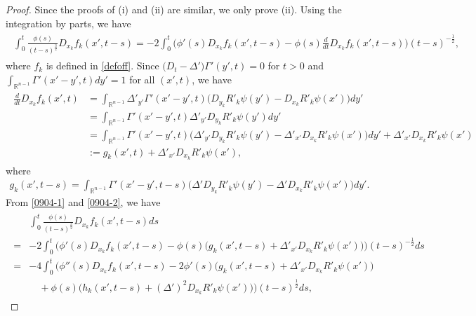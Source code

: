 \documentclass{amsart}
\numberwithin{equation}{section}
\newcommand{\Rn}{{\mathbb R}^{n-1}}
\newcommand{\De}{\Delta}
\newcommand{\Ga}{\Gamma}
\begin{document}
 \begin{proof}
Since the proofs of (i) and (ii) are similar, we only prove (ii). Using the integration by parts, we have 
\begin{align}\label{0904-1}
\begin{split}
\int_0^t   \frac{\phi(s)}{(t-s)^\frac32}     D_{x_k}  f_k (x', t-s) 
=  -  2\int_0^t    \Big(  \phi' (s)      D_{x_k}  f _k (x', t-s)  -  \phi (s)      \frac{d}{dt} D_{x_k}  f _k (x', t-s)  \Big)  (t-s)^{-\frac12} ,
\end{split}
\end{align}
where $f_k$ is defined in \eqref{defoff}. 
Since $ \big( D_t -\De' \big) \Ga'(y', t) =0$ for $ t> 0$ and   $\int_{\Rn} \Ga' (x' - y', t) dy' =1$ for all  $(x', t)$, we have
\begin{align}\label{0904-2}
\begin{split}
\frac{d}{dt}  D_{x_k}  f _k ( x', t)  &  =\int_{\Rn} \De'_{y'} \Ga' (x'-y', t) \Big( D_{y_k} R'_k \psi(y')  - D_{x_k} R'_k \psi(x') \Big) dy'\\  
&  =\int_{\Rn}  \Ga' (x'-y', t)  \De'_{y '} D_{y_k} R'_k \psi(y')  dy'\\ 
&  =\int_{\Rn}   \Ga' (x'-y', t) \Big(  \De'_{y'} D_{y_k}   R'_k\psi(y')  -  \De'_{x'} D_{x_k} R'_k \psi(x') \Big) dy' + \De'_{x'} D_{x_k} R'_k \psi(x')\\
& := g_k(x', t) +   \De'_{x'} D_{x_k} R'_k \psi(x'),
\end{split}
\end{align}
where 
\begin{align*}
g_k (x', t-s)  = \int_{\Rn} \Ga' (x'- y', t-s) \Big(  \De'  D_{y_k} R'_k \psi(y') -   \De' D_{x_k}  R'_k \psi(x') \Big) dy'.
\end{align*} 
From \eqref{0904-1} and \eqref{0904-2},  we have 
\begin{align*}%
\begin{split}
&\int_0^t   \frac{\phi(s)}{(t-s)^\frac32}  D_{x_k}  f _k (x', t-s) ds\\
 =& -  2\int_0^t    \Big(  \phi' (s)    D_{x_k}  f _k (x', t-s)  -  \phi (s)   \big(g_k (x', t-s) +   \De'_{x'} D_{x_k} R'_k \psi(x')    \big)  \Big)  (t-s)^{-\frac12}   ds\\
=& - 4\int_0^t    \Big(  \phi'' (s)    D_{x_k}  f _k(x', t-s)  -  2\phi'  (s)   \Big(g_k (x', t-s) +   \De'_{x'} D_{x_k} R'_k \psi(x') \Big) \\
& \quad    + \phi (s) \big(h_k (x', t-s)   + ( \De')^2 D_{x_k}  R'_k \psi(x')   \big) \Big)  (t-s)^{\frac12}   ds,
\end{split}
\end{align*}




\end{proof}
\end{document}
